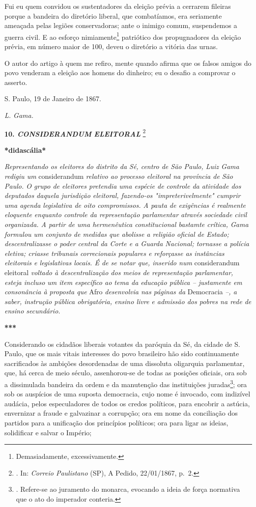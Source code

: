 Fui eu quem convidou os sustentadores da eleição prévia a cerrarem
fileiras porque a bandeira do diretório liberal, que combatíamos, era
seriamente ameaçada pelas legiões conservadoras; ante o inimigo comum,
suspendemos a guerra civil. E ao esforço nimiamente\footnote{Demasiadamente,
  excessivamente.} patriótico dos propugnadores da eleição prévia, em
número maior de 100, deveu o diretório a vitória das urnas.

O autor do artigo à quem me refiro, mente quando afirma que os falsos
amigos do povo venderam a eleição aos homens do dinheiro; eu o desafio a
comprovar o asserto.

S. Paulo, 19 de Janeiro de 1867.

\emph{L. Gama.}

\textbf{10. \emph{CONSIDERANDUM} \emph{ELEITORAL}} \footnote{. In:
  \emph{Correio Paulistano} (SP), A Pedido, 22/01/1867, p.~2.}

\textbf{*didascália*}

\emph{Representando os eleitores do distrito da Sé, centro de São Paulo,
Luiz Gama redigiu um} considerandum \emph{relativo ao processo eleitoral
na província de São Paulo. O grupo de eleitores pretendia uma espécie de
controle da atividade dos deputados daquela jurisdição eleitoral,
fazendo-os "impreterivelmente" cumprir uma agenda legislativa de oito
compromissos. A pauta de exigências é realmente eloquente enquanto
controle da representação parlamentar através sociedade civil
organizada. A partir de uma hermenêutica constitucional bastamte
crítica, Gama formulou um conjunto de medidas que abolisse a religião
oficial de Estado; descentralizasse o poder central da Corte e a Guarda
Nacional; tornasse a polícia eletiva; criasse tribunais correcionais
populares e reforçasse as instâncias eleitorais e legislativas locais. É
de se notar que, inserido num} considerandum eleitoral \emph{voltado à
descentralização dos meios de representação parlamentar, esteja incluso
um item específico ao tema da educação pública -- justamente em
consonância à proposta que} Afro \emph{desenvolvia nas páginas da}
Democracia \emph{--, a saber, instrução pública obrigatória, ensino
livre e admissão dos pobres na rede de ensino secundário.}

\textbf{***}

Considerando os cidadãos liberais votantes da paróquia da Sé, da cidade
de S. Paulo, que os mais vitais interesses do povo brasileiro hão sido
continuamente sacrificados às ambições desordenadas de uma dissoluta
oligarquia parlamentar, que, há cerca de meio século, assenhorou-se de
todas as posições oficiais, ora sob a dissimulada bandeira da ordem e da
manutenção das instituições juradas\footnote{. Refere-se ao juramento do
  monarca, evocando a ideia de força normativa que o ato do imperador
  conteria.}; ora sob os auspícios de uma suposta democracia, cujo nome
é invocado, com indizível audácia, pelos especuladores de todos os
credos políticos, para encobrir a astúcia, envernizar a fraude e
galvazinar a corrupção; ora em nome da conciliação dos partidos para a
unificação dos princípios políticos; ora para ligar as ideias,
solidificar e salvar o Império;

